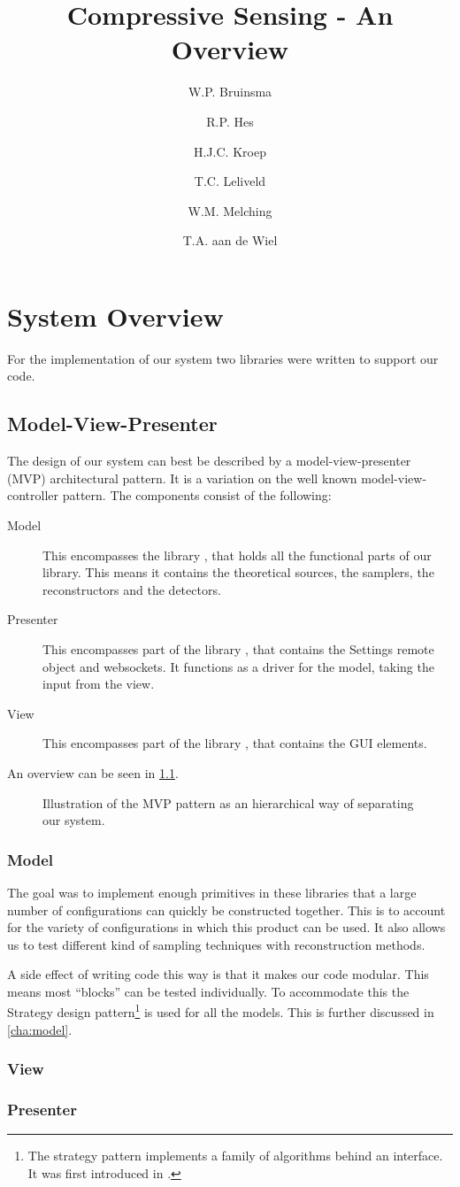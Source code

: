 \documentclass[a4paper, openany, oneside]{memoir}
\title{Compressive Sensing - An Overview}
\author{W.P. Bruinsma \and R.P. Hes \and H.J.C. Kroep \and T.C. Leliveld \and W.M. Melching \and T.A. aan de Wiel}
\begin{document}
\chapter{System Overview}
For the implementation of our system two libraries were written to support our code.

\section{Model-View-Presenter}
\label{sec:model-view-presenter}
The design of our system can best be described by a model-view-presenter (MVP) architectural pattern. It is a variation on the well known model-view-controller pattern. The components consist of the following:
\begin{description}
    \item[Model] This encompasses the library , that holds all the functional parts of our library. This means it contains the theoretical sources, the samplers, the reconstructors and the detectors.
    \item[Presenter] This encompasses part of the library , that contains the Settings remote object and websockets. It functions as a driver for the model, taking the input from the view.
    \item[View] This encompasses part of the library , that contains the GUI elements.
\end{description}
An overview can be seen in \cref{fig:MVP}.

\begin{figure}
    \centering
    
    \caption{Illustration of the MVP pattern as an hierarchical way of separating our system.}
    \label{fig:MVP}
\end{figure}

\subsection{Model}
\label{sub:model}
The goal was to implement enough primitives in these libraries that a large number of configurations can quickly be constructed together. This is to account for the variety of configurations in which this product can be used. It also allows us to test different kind of sampling techniques with reconstruction methods.

A side effect of writing code this way is that it makes our code modular. This means most ``blocks'' can be tested individually. To accommodate this the Strategy design pattern\footnote{The strategy pattern implements a family of algorithms behind an interface. It was first introduced in \cite{designpatterns}.} is used for all the models. This is further discussed in \cref{cha:model}.

\subsection{View}
\label{sub:view}

\subsection{Presenter}
\label{sub:presenter}
\end{document}
